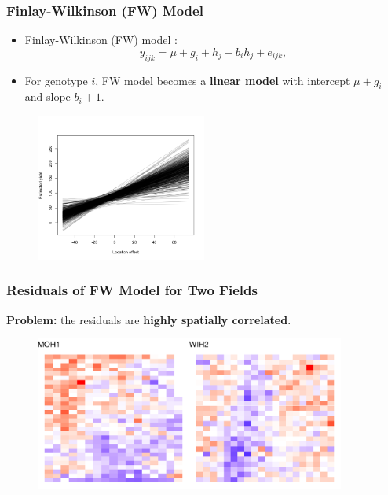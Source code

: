\documentclass{beamer}
\begin{document}
\begin{frame}
	\frametitle{Finlay-Wilkinson (FW) Model}
	\begin{itemize}
	\item Finlay-Wilkinson (FW) model \citep{finlay1963analysis}: 
	$$y_{ijk} = \mu + g_i + h_j + b_i h_j + e_{ijk},$$
 \item For genotype $i$, FW model becomes a \textbf{linear model} with intercept $\mu + g_i$ and slope $b_i + 1 $.
	\end{itemize}		
		\begin{figure}[H]
		\centering
		\includegraphics[width = 0.5\textwidth]{image8.png}
	\end{figure}
\end{frame}






\begin{frame}
	\frametitle{Residuals of FW Model for Two Fields}
	\textbf{Problem:} the residuals are \textbf{highly spatially correlated}.
	\begin{figure}[H]
		\centering
		\includegraphics[width = 0.91\textwidth]{resid_plot_2.pdf}
	\end{figure}
\end{frame}
\end{document}
